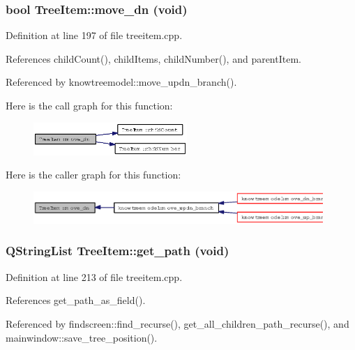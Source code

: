 \subsubsection{\setlength{\rightskip}{0pt plus 5cm}bool Tree\-Item::move\_\-dn (void)}\label{classTreeItem_e47dfb60f0633c684ddc7a46ceb83d0e}




Definition at line 197 of file treeitem.cpp.

References child\-Count(), child\-Items, child\-Number(), and parent\-Item.

Referenced by knowtreemodel::move\_\-updn\_\-branch().

Here is the call graph for this function:\begin{figure}[H]
\begin{center}
\leavevmode
\includegraphics[width=165pt]{classTreeItem_e47dfb60f0633c684ddc7a46ceb83d0e_cgraph}
\end{center}
\end{figure}


Here is the caller graph for this function:\begin{figure}[H]
\begin{center}
\leavevmode
\includegraphics[width=311pt]{classTreeItem_e47dfb60f0633c684ddc7a46ceb83d0e_icgraph}
\end{center}
\end{figure}
\subsubsection{\setlength{\rightskip}{0pt plus 5cm}QString\-List Tree\-Item::get\_\-path (void)}\label{classTreeItem_a47b4b36567db4559ceafc910d70c4da}




Definition at line 213 of file treeitem.cpp.

References get\_\-path\_\-as\_\-field().

Referenced by findscreen::find\_\-recurse(), get\_\-all\_\-children\_\-path\_\-recurse(), and mainwindow::save\_\-tree\_\-position().

